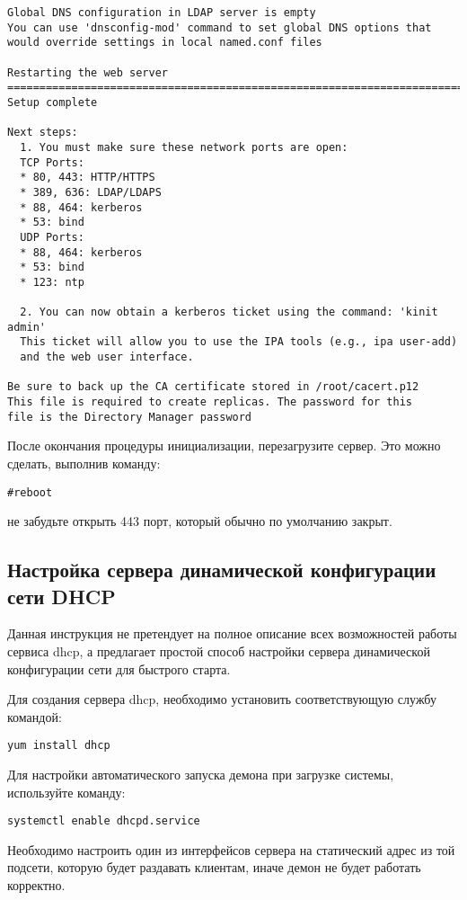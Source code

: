 \documentclass[a4paper,10pt,twoside]{article}
\begin{document}
\begin{verbatim}
Global DNS configuration in LDAP server is empty
You can use 'dnsconfig-mod' command to set global DNS options that
would override settings in local named.conf files

Restarting the web server
==============================================================================
Setup complete

Next steps:
  1. You must make sure these network ports are open:
  TCP Ports:
  * 80, 443: HTTP/HTTPS
  * 389, 636: LDAP/LDAPS
  * 88, 464: kerberos
  * 53: bind
  UDP Ports:
  * 88, 464: kerberos
  * 53: bind
  * 123: ntp

  2. You can now obtain a kerberos ticket using the command: 'kinit admin'
  This ticket will allow you to use the IPA tools (e.g., ipa user-add)
  and the web user interface.

Be sure to back up the CA certificate stored in /root/cacert.p12
This file is required to create replicas. The password for this
file is the Directory Manager password
\end{verbatim} 

После окончания процедуры инициализации, перезагрузите сервер. Это можно сделать, выполнив команду:
\begin{verbatim}
#reboot
\end{verbatim}

 не забудьте открыть 443 порт, который обычно по умолчанию закрыт.

\subsection{Настройка  сервера динамической конфигурации сети DHCP}
Данная инструкция не претендует на полное описание всех возможностей работы сервиса dhcp, а предлагает простой способ настройки  сервера динамической конфигурации сети для быстрого старта.

Для создания сервера dhcp, необходимо установить соответствующую службу командой:

\begin{verbatim}
yum install dhcp
\end{verbatim} 

Для настройки автоматического запуска демона при загрузке системы, используйте  команду:
\begin{verbatim}
systemctl enable dhcpd.service
\end{verbatim} 

Необходимо настроить один из интерфейсов сервера на статический адрес из той подсети, которую будет раздавать клиентам, иначе демон не будет работать корректно.
\end{document}
